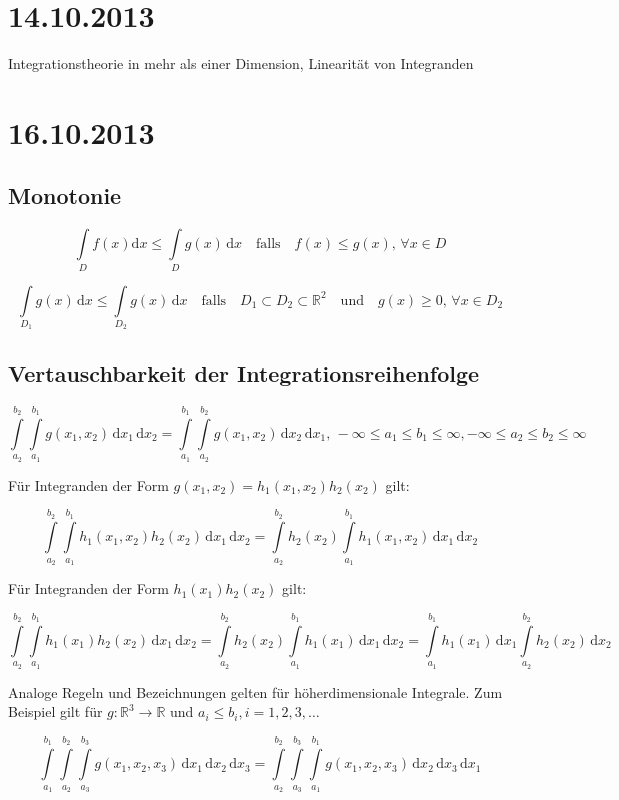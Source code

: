 \documentclass[12pt, a4paper]{article}
\title{\doctitle}
\author{\authors}
\date{\today}
\newcommand{\expage}{} %
\theoremstyle{empty}
\newcommand{\R}{\mathbb{R}}
\newcommand{\1}{\mathds{1}}
\renewcommand{\d}{\,\mathrm{d}}
\providecommand{\mtext}[1]{\quad \text{#1} \quad}
\begin{document}
\section{14.10.2013}
Integrationstheorie in mehr als einer Dimension, Linearität von Integranden
\section*{16.10.2013}
\subsection{Monotonie}
$$\int\limits_D f(x) \mathrm{d}x \leq \int\limits_D g(x) \d x \quad \text{falls} \quad f(x) \leq g(x), \, \forall x \in D$$

$$ \int\limits_{D_1} g(x) \d x \leq \int\limits_{D_2} g(x) \d x \mtext{falls} D_1 \subset D_2 \subset \R^2 \mtext{und} g(x) \geq 0, \, \forall x \in D_2$$

\subsection{Vertauschbarkeit der Integrationsreihenfolge}

\[\int\limits_{a_2}^{b_2}  \int\limits_{a_1}^{b_1}  g(x_1, x_2) \d x_1 \d x_2   =  \int\limits_{a_1}^{b_1} \int\limits_{a_2}^{b_2} g(x_1, x_2) \d x_2  \d x_1, \, -\infty \leq a_1 \leq b_1 \leq \infty , -\infty \leq a_2 \leq b_2 \leq \infty\]

Für Integranden der Form $g(x_1, x_2) = h_1(x_1, x_2) h_2(x_2)$ gilt:

\[ \int\limits_{a_2}^{b_2} \int\limits_{a_1}^{b_1}  h_1(x_1, x_2) h_2(x_2) \d x_1 \d x_2  = \int\limits_{a_2}^{b_2} h_2(x_2) \int\limits_{a_1}^{b_1} h_1(x_1, x_2) \d x_1 \d x_2 \]

Für Integranden der Form $ h_1(x_1) h_2(x_2) $ gilt:

\[ \int\limits_{a_2}^{b_2} \int\limits_{a_1}^{b_1} h_1(x_1) h_2(x_2) \d x_1 \d x_2 = \int\limits_{a_2}^{b_2} h_2(x_2) \int\limits_{a_1}^{b_1} h_1(x_1) \d x_1 \d x_2 =  \int\limits_{a_1}^{b_1} h_1(x_1) \d x_1 \int\limits_{a_2}^{b_2} h_2(x_2) \d x_2 \]

Analoge Regeln und Bezeichnungen gelten für höherdimensionale Integrale. Zum Beispiel gilt für $g:\R^3 \to \R$ und $a_i \leq b_i, i=1,2,3,\ldots$

\[ \int\limits_{a_1}^{b_1} \int\limits_{a_2}^{b_2} \int\limits_{a_3}^{b_3}  g(x_1, x_2, x_3) \d x_1 \d x_2 \d x_3 =  \int\limits_{a_2}^{b_2}  \int\limits_{a_3}^{b_3} \int\limits_{a_1}^{b_1} 
g(x_1, x_2, x_3) \d x_2 \d x_3 \d x_1\]
\end{document}
